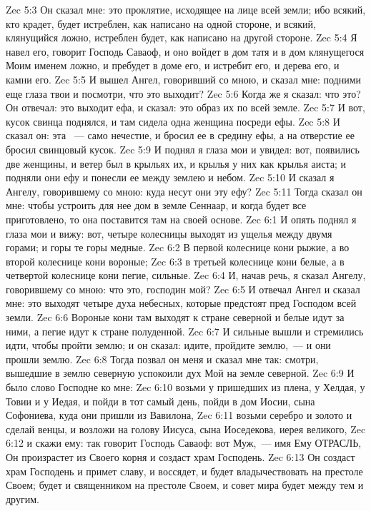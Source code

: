 \vs Zec 5:3 Он сказал мне: это проклятие, исходящее на лице всей земли; ибо всякий, кто крадет, будет истреблен, как написано на одной стороне, и всякий, клянущийся ложно, истреблен будет, как написано на другой стороне.
\vs Zec 5:4 Я навел его, говорит Господь Саваоф, и оно войдет в дом татя и в дом клянущегося Моим именем ложно, и пребудет в доме его, и истребит его, и дерева его, и камни его.
\vs Zec 5:5 И вышел Ангел, говоривший со мною, и сказал мне: подними еще глаза твои и посмотри, что это выходит?
\vs Zec 5:6 Когда же я сказал: что это? Он отвечал: это выходит ефа, и сказал: это образ их по всей земле.
\vs Zec 5:7 И вот, кусок свинца поднялся, и там сидела одна женщина посреди ефы.
\vs Zec 5:8 И сказал он: эта ~--- само нечестие, и бросил ее в средину ефы, а на отверстие ее бросил свинцовый кусок.
\vs Zec 5:9 И поднял я глаза мои и увидел: вот, появились две женщины, и ветер был в крыльях их, и крылья у них как крылья аиста; и подняли они ефу и понесли ее между землею и небом.
\vs Zec 5:10 И сказал я Ангелу, говорившему со мною: куда несут они эту ефу?
\vs Zec 5:11 Тогда сказал он мне: чтобы устроить для нее дом в земле Сеннаар, и когда будет все приготовлено, то она поставится там на своей основе.
\vs Zec 6:1 И опять поднял я глаза мои и вижу: вот, четыре колесницы выходят из ущелья между двумя горами; и горы те  горы медные.
\vs Zec 6:2 В первой колеснице кони рыжие, а во второй колеснице кони вороные;
\vs Zec 6:3 в третьей колеснице кони белые, а в четвертой колеснице кони пегие, сильные.
\vs Zec 6:4 И, начав речь, я сказал Ангелу, говорившему со мною: что это, господин мой?
\vs Zec 6:5 И отвечал Ангел и сказал мне: это выходят четыре духа небесных, которые предстоят пред Господом всей земли.
\vs Zec 6:6 Вороные кони там выходят к стране северной и белые идут за ними, а пегие идут к стране полуденной.
\vs Zec 6:7 И сильные вышли и стремились идти, чтобы пройти землю; и он сказал: идите, пройдите землю,~--- и они прошли землю.
\vs Zec 6:8 Тогда позвал он меня и сказал мне так: смотри, вышедшие в землю северную успокоили дух Мой на земле северной.
\vs Zec 6:9 И было слово Господне ко мне:
\vs Zec 6:10 возьми у пришедших из плена, у Хелдая, у Товии и у Иедая, и пойди в тот самый день, пойди в дом Иосии, сына Софониева, куда они пришли из Вавилона,
\vs Zec 6:11 возьми  серебро и золото и сделай венцы, и возложи на голову Иисуса, сына Иоседекова, иерея великого,
\vs Zec 6:12 и скажи ему: так говорит Господь Саваоф: вот Муж,~--- имя Ему ОТРАСЛЬ, Он произрастет из Своего корня и создаст храм Господень.
\vs Zec 6:13 Он создаст храм Господень и примет славу, и воссядет, и будет владычествовать на престоле Своем; будет и священником на престоле Своем, и совет мира будет между тем и другим.
